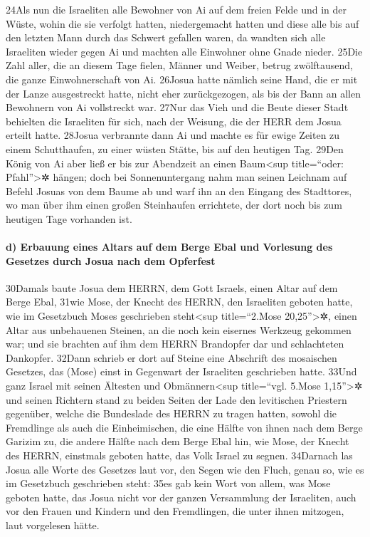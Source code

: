 24Als nun die Israeliten alle Bewohner von Ai auf dem freien Felde und
in der Wüste, wohin die sie verfolgt hatten, niedergemacht hatten und
diese alle bis auf den letzten Mann durch das Schwert gefallen waren, da
wandten sich alle Israeliten wieder gegen Ai und machten alle Einwohner
ohne Gnade nieder. 25Die Zahl aller, die an diesem Tage fielen, Männer
und Weiber, betrug zwölftausend, die ganze Einwohnerschaft von Ai.
26Josua hatte nämlich seine Hand, die er mit der Lanze ausgestreckt
hatte, nicht eher zurückgezogen, als bis der Bann an allen Bewohnern von
Ai vollstreckt war. 27Nur das Vieh und die Beute dieser Stadt behielten
die Israeliten für sich, nach der Weisung, die der HERR dem Josua
erteilt hatte. 28Josua verbrannte dann Ai und machte es für ewige Zeiten
zu einem Schutthaufen, zu einer wüsten Stätte, bis auf den heutigen Tag.
29Den König von Ai aber ließ er bis zur Abendzeit an einen
Baum\textless sup title=``oder: Pfahl''\textgreater✲ hängen; doch bei
Sonnenuntergang nahm man seinen Leichnam auf Befehl Josuas von dem Baume
ab und warf ihn an den Eingang des Stadttores, wo man über ihm einen
großen Steinhaufen errichtete, der dort noch bis zum heutigen Tage
vorhanden ist.

\hypertarget{d-erbauung-eines-altars-auf-dem-berge-ebal-und-vorlesung-des-gesetzes-durch-josua-nach-dem-opferfest}{%
\paragraph{d) Erbauung eines Altars auf dem Berge Ebal und Vorlesung des
Gesetzes durch Josua nach dem
Opferfest}\label{d-erbauung-eines-altars-auf-dem-berge-ebal-und-vorlesung-des-gesetzes-durch-josua-nach-dem-opferfest}}

30Damals baute Josua dem HERRN, dem Gott Israels, einen Altar auf dem
Berge Ebal, 31wie Mose, der Knecht des HERRN, den Israeliten geboten
hatte, wie im Gesetzbuch Moses geschrieben steht\textless sup
title=``2.Mose 20,25''\textgreater✲, einen Altar aus unbehauenen
Steinen, an die noch kein eisernes Werkzeug gekommen war; und sie
brachten auf ihm dem HERRN Brandopfer dar und schlachteten Dankopfer.
32Dann schrieb er dort auf Steine eine Abschrift des mosaischen
Gesetzes, das (Mose) einst in Gegenwart der Israeliten geschrieben
hatte. 33Und ganz Israel mit seinen Ältesten und Obmännern\textless sup
title=``vgl. 5.Mose 1,15''\textgreater✲ und seinen Richtern stand zu
beiden Seiten der Lade den levitischen Priestern gegenüber, welche die
Bundeslade des HERRN zu tragen hatten, sowohl die Fremdlinge als auch
die Einheimischen, die eine Hälfte von ihnen nach dem Berge Garizim zu,
die andere Hälfte nach dem Berge Ebal hin, wie Mose, der Knecht des
HERRN, einstmals geboten hatte, das Volk Israel zu segnen. 34Darnach las
Josua alle Worte des Gesetzes laut vor, den Segen wie den Fluch, genau
so, wie es im Gesetzbuch geschrieben steht: 35es gab kein Wort von
allem, was Mose geboten hatte, das Josua nicht vor der ganzen
Versammlung der Israeliten, auch vor den Frauen und Kindern und den
Fremdlingen, die unter ihnen mitzogen, laut vorgelesen hätte.

